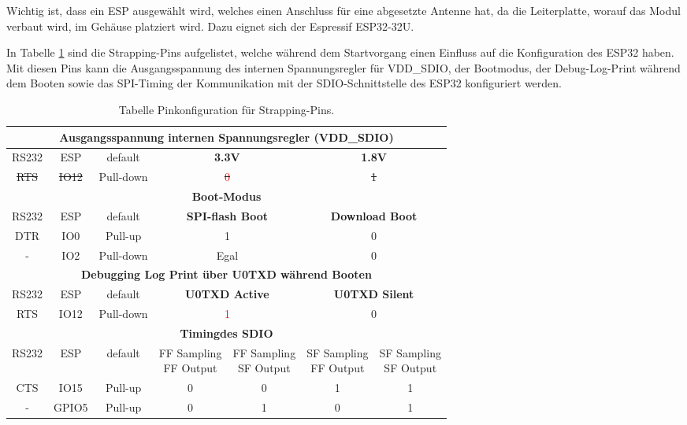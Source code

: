 Wichtig ist, dass ein ESP ausgewählt wird, welches einen Anschluss für eine abgesetzte Antenne hat, da die Leiterplatte, worauf das Modul verbaut wird, im Gehäuse platziert wird. Dazu eignet sich der Espressif ESP32-32U.

\newpage

In Tabelle \ref{tab:Strapping_pins} sind die Strapping-Pins aufgelistet, welche während dem Startvorgang einen Einfluss auf die Konfiguration des ESP32 haben. Mit diesen Pins kann die Ausgangsspannung des internen Spannungsregler für VDD\_SDIO, der Bootmodus, der Debug-Log-Print während dem Booten sowie das SPI-Timing der Kommunikation mit der SDIO-Schnittstelle des ESP32 konfiguriert werden.

\begin{table}[h!]
\center
\begin{tabular}{|c|c|c|c|c|c|c|}
\hline
\multicolumn{7}{|c|}{\textbf{Ausgangsspannung internen Spannungsregler (VDD\_SDIO)}}\\
\hline
RS232 & ESP & default & \multicolumn{2}{|c|}{\textbf{3.3V}} & \multicolumn{2}{|c|}{\textbf{1.8V}}\\
\hline
\sout{RTS} & \sout{IO12} & Pull-down & \multicolumn{2}{|c|}{\sout{\textcolor{red}{0}}\footnotemark} & \multicolumn{2}{|c|}{\sout{1}}\\
\hline
\multicolumn{7}{|c|}{\textbf{Boot-Modus}}\\
\hline
RS232 & ESP & default & \multicolumn{2}{|c|}{\textbf{SPI-flash Boot}} & \multicolumn{2}{|c|}{\textbf{Download Boot}}\\
\hline
DTR & IO0 & Pull-up & \multicolumn{2}{|c|}{1} & \multicolumn{2}{|c|}{0}\\
\hline
- & IO2 & Pull-down & \multicolumn{2}{|c|}{Egal} & \multicolumn{2}{|c|}{0}\\
\hline
\multicolumn{7}{|c|}{\textbf{Debugging Log Print über U0TXD während Booten}}\\
\hline
RS232 & ESP & default & \multicolumn{2}{|c|}{\textbf{U0TXD Active}} & \multicolumn{2}{|c|}{\textbf{U0TXD Silent}}\\
\hline
RTS & IO12 & Pull-down & \multicolumn{2}{|c|}{\textcolor{red}{1}} & \multicolumn{2}{|c|}{0}\\
\hline
\multicolumn{7}{|c|}{\textbf{Timing\footnotemark des SDIO}}\\
\hline
RS232 & ESP & default & \shortstack{FF Sampling \\ FF Output} & \shortstack{FF Sampling \\ SF Output} & \shortstack{SF Sampling \\ FF Output} & \shortstack{SF Sampling \\ SF Output} \\
\hline
CTS & IO15 & Pull-up & 0 & 0 & 1 & 1 \\
\hline
- & GPIO5 & Pull-up & 0 & 1 & 0 & 1 \\
\hline
\end{tabular}

\caption{Tabelle Pinkonfiguration für Strapping-Pins.}
\label{tab:Strapping_pins}
\end{table}
